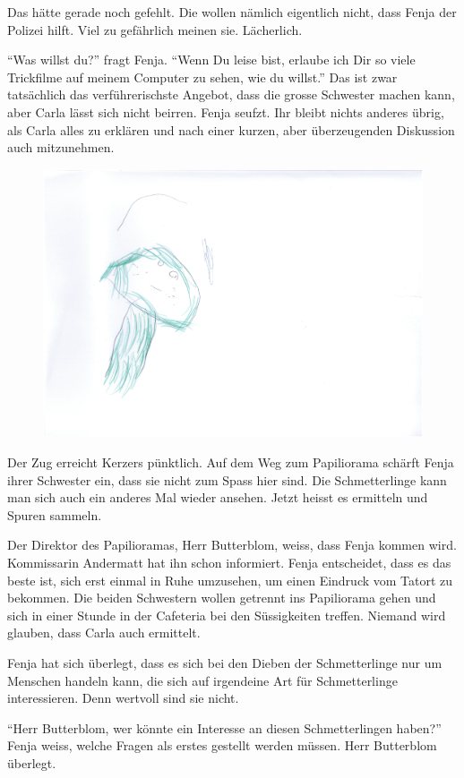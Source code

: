 Das hätte gerade noch gefehlt. Die wollen nämlich eigentlich nicht, dass Fenja der Polizei hilft. Viel zu gefährlich meinen sie. Lächerlich. 

\enquote{Was willst du?} fragt Fenja. \enquote{Wenn Du leise bist, erlaube ich Dir so viele Trickfilme auf meinem Computer zu sehen, wie du willst.} Das ist zwar tatsächlich das verführerischste Angebot, dass die grosse Schwester machen kann, aber Carla lässt sich nicht beirren. Fenja seufzt. Ihr bleibt nichts anderes übrig, als Carla alles zu erklären und nach einer kurzen, aber überzeugenden Diskussion auch mitzunehmen. 

\begin{figure}[h]
\centering
\includegraphics[width=.6\textwidth]{bilder/schmetterlingg.pdf}
\end{figure}
Der Zug erreicht Kerzers pünktlich. Auf dem Weg zum Papiliorama schärft Fenja ihrer Schwester ein, dass sie nicht zum Spass hier sind. Die Schmetterlinge kann man sich auch ein anderes Mal wieder ansehen. Jetzt heisst es ermitteln und Spuren sammeln.

Der Direktor des Papilioramas, Herr Butterblom, weiss, dass Fenja kommen wird. Kommissarin Andermatt hat ihn schon informiert. Fenja entscheidet, dass es das beste ist, sich erst einmal in Ruhe umzusehen, um einen Eindruck vom Tatort zu bekommen. Die beiden Schwestern wollen getrennt ins Papiliorama gehen und sich in einer Stunde in der Cafeteria bei den Süssigkeiten treffen. Niemand wird glauben, dass Carla auch ermittelt.

Fenja hat sich überlegt, dass es sich bei den Dieben der Schmetterlinge nur um Menschen handeln kann, die sich auf irgendeine Art für Schmetterlinge interessieren. Denn wertvoll sind sie nicht.  

\enquote{Herr Butterblom, wer könnte ein Interesse an diesen Schmetterlingen haben?} Fenja weiss, welche Fragen als erstes gestellt werden müssen. Herr Butterblom überlegt.

